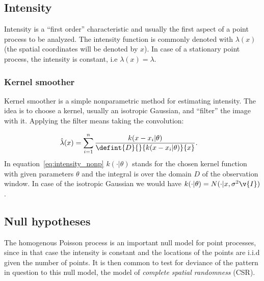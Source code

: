 \documentclass[12pt,a4paper,oneside,article]{memoir}
\begin{document}
\subsection{Intensity}
Intensity is a ``first order'' characteristic and usually the first aspect
of a point process to be analyzed. The intensity function is commonly denoted with $\lambda(x)$ (the spatial
coordinates will be denoted by $x$).
In case of a stationary point process, the intensity is constant, i.e $\lambda(x)=\lambda$.

\subsubsection{Kernel smoother}

Kernel smoother is a simple nonparametric method for estimating intensity. The idea is
to choose a kernel, usually an isotropic Gaussian, and ``filter'' the image with it. 
Applying the filter means taking the convolution:

\begin{align}
	\hat{\lambda}(x)&=\sum_{i=1}^n\frac{k(x-x_i|\theta)}{\defint{D}{}{k(x-x_i|\theta)}{x}}.
	\label{eq:intensity_nonp}
\end{align}
In equation~\eqref{eq:intensity_nonp} $k(\cdot|\theta)$ stands for the chosen kernel function with
given parameters $\theta$ and the integral is over the domain $D$ of the observation window. 
In case of the isotropic Gaussian we would have $k(\cdot|\theta)=N(\cdot|x,\sigma^2\v{I})$.


\subsection{Null hypotheses}

The homogenous Poisson process is an important null model for point processes, since
in that case the intensity is constant and the locations of the points are i.i.d given
the number of points. It is then common to test for deviance of the pattern in question
to this null model, the model of \emph{complete spatial randomness} (CSR).
\end{document}
